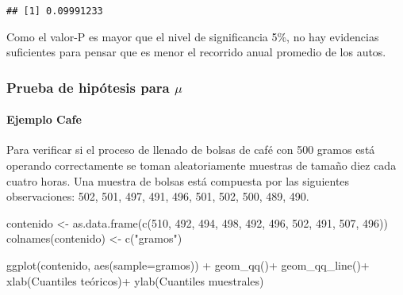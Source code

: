\documentclass[
]{article}
\newenvironment{Shaded}{}{}
\newcommand{\AttributeTok}[1]{\textcolor[rgb]{0.49,0.56,0.16}{#1}}
\newcommand{\DecValTok}[1]{\textcolor[rgb]{0.25,0.63,0.44}{#1}}
\newcommand{\FunctionTok}[1]{\textcolor[rgb]{0.02,0.16,0.49}{#1}}
\newcommand{\NormalTok}[1]{#1}
\newcommand{\OtherTok}[1]{\textcolor[rgb]{0.00,0.44,0.13}{#1}}
\newcommand{\SpecialCharTok}[1]{\textcolor[rgb]{0.25,0.44,0.63}{#1}}
\newcommand{\StringTok}[1]{\textcolor[rgb]{0.25,0.44,0.63}{#1}}
\begin{document}
\begin{verbatim}
## [1] 0.09991233
\end{verbatim}

Como el valor-P es mayor que el nivel de significancia 5\%, no hay
evidencias suficientes para pensar que es menor el recorrido anual
promedio de los autos.

\hypertarget{prueba-de-hipuxf3tesis-para-mu}{%
\subsubsection{\texorpdfstring{Prueba de hipótesis para
\(\mu\)}{Prueba de hipótesis para \textbackslash mu}}\label{prueba-de-hipuxf3tesis-para-mu}}

\hypertarget{ejemplo-cafe}{%
\paragraph{Ejemplo Cafe}\label{ejemplo-cafe}}

Para verificar si el proceso de llenado de bolsas de café con 500 gramos
está operando correctamente se toman aleatoriamente muestras de tamaño
diez cada cuatro horas. Una muestra de bolsas está compuesta por las
siguientes observaciones: 502, 501, 497, 491, 496, 501, 502, 500, 489,
490.

\begin{Shaded}
\begin{Highlighting}[]
\NormalTok{contenido }\OtherTok{\textless{}{-}} \FunctionTok{as.data.frame}\NormalTok{(}\FunctionTok{c}\NormalTok{(}\DecValTok{510}\NormalTok{, }\DecValTok{492}\NormalTok{, }\DecValTok{494}\NormalTok{, }\DecValTok{498}\NormalTok{, }\DecValTok{492}\NormalTok{,}
               \DecValTok{496}\NormalTok{, }\DecValTok{502}\NormalTok{, }\DecValTok{491}\NormalTok{, }\DecValTok{507}\NormalTok{, }\DecValTok{496}\NormalTok{))}
\FunctionTok{colnames}\NormalTok{(contenido) }\OtherTok{\textless{}{-}} \FunctionTok{c}\NormalTok{(}\StringTok{"gramos"}\NormalTok{)}

\FunctionTok{ggplot}\NormalTok{(contenido, }\FunctionTok{aes}\NormalTok{(}\AttributeTok{sample=}\NormalTok{gramos)) }\SpecialCharTok{+} 
  \FunctionTok{geom\_qq}\NormalTok{()}\SpecialCharTok{+}
  \FunctionTok{geom\_qq\_line}\NormalTok{()}\SpecialCharTok{+}
  \FunctionTok{xlab}\NormalTok{(}\StringTok{\textquotesingle{}Cuantiles teóricos\textquotesingle{}}\NormalTok{)}\SpecialCharTok{+}
  \FunctionTok{ylab}\NormalTok{(}\StringTok{\textquotesingle{}Cuantiles muestrales\textquotesingle{}}\NormalTok{)}
\end{Highlighting}
\end{Shaded}
\end{document}
